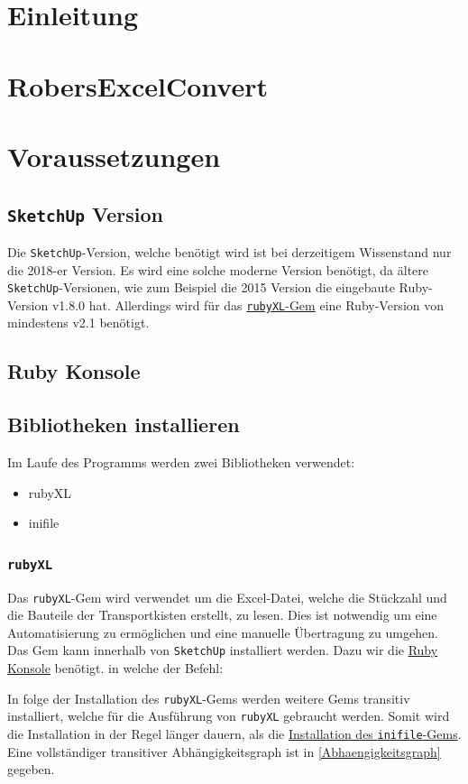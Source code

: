\documentclass{book}
\newcommand{\sketchup}{\texttt{SketchUp}\xspace}
\newcommand{\rubyXL}{\texttt{rubyXL}\xspace}
\newcommand{\inifile}{\texttt{inifile}\xspace}
\begin{document}
	
	
	
	\tableofcontents
	\chapter{Einleitung}
	
	\chapter{RobersExcelConvert}
	\chapter{Voraussetzungen}
		\section{\sketchup Version}
			Die \sketchup-Version, welche benötigt wird ist bei derzeitigem Wissenstand nur die 2018-er Version. Es wird eine solche moderne Version benötigt, da ältere \sketchup-Versionen, wie zum Beispiel die 2015 Version die eingebaute Ruby-Version v1.8.0 hat. Allerdings wird für das \hyperref[rubyXL]{\rubyXL-Gem} eine Ruby-Version von mindestens v2.1 benötigt.
		\section{Ruby Konsole} \label{Ruby Konsole}
			
		\section{Bibliotheken installieren} \label{Installation}
			Im Laufe des Programms werden zwei Bibliotheken verwendet:\\
			\begin{itemize}
				\item[] rubyXL
				\item[] inifile
			\end{itemize}		
				
			\subsection{\rubyXL} \label{rubyXL}
				Das \rubyXL-Gem wird verwendet um die Excel-Datei, welche die Stückzahl und die Bauteile der Transportkisten erstellt, zu lesen. Dies ist notwendig um eine Automatisierung zu ermöglichen und eine manuelle Übertragung zu umgehen.\\
				Das Gem kann innerhalb von \sketchup installiert werden. Dazu wir die \hyperref[Ruby Konsole]{Ruby Konsole} benötigt. in welche der Befehl:
				
				In folge der Installation des \rubyXL-Gems werden weitere Gems transitiv installiert, welche für die Ausführung von \rubyXL gebraucht werden. Somit wird die Installation in der Regel länger dauern, als die \hyperref[inifile]{Installation des \inifile-Gems}.\\
				Eine vollständiger transitiver Abhängigkeitsgraph ist in \ref{Abhaengigkeitsgraph} gegeben.
\end{document}
